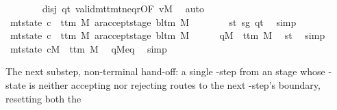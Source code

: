 \begin{isabellebody}
\ \ \ \ \ \ \isamarkupfalse%
\ disj\ qt\ valid{\isacharunderscore}{\kern0pt}mttm{\isacharunderscore}{\kern0pt}t{\isacharunderscore}{\kern0pt}neq{\isacharunderscore}{\kern0pt}r{\isacharbrackleft}{\kern0pt}OF\ vM{\isacharbrackright}{\kern0pt}\ \isamarkupfalse%
\ auto\isanewline
\ \ \ \ \isamarkupfalse%
\ {\isachardoublequoteopen}mt{\isacharunderscore}{\kern0pt}state\ c{\isacharprime}{\kern0pt}\ {\isacharequal}{\kern0pt}\ {\isacharparenleft}{\kern0pt}t{\isacharunderscore}{\kern0pt}tm\ M{\isacharcomma}{\kern0pt}\ ar{\isacharunderscore}{\kern0pt}accept{\isacharunderscore}{\kern0pt}stage\ {\isacharparenleft}{\kern0pt}bl{\isacharunderscore}{\kern0pt}tm\ M{\isacharparenright}{\kern0pt}{\isacharparenright}{\kern0pt}{\isachardoublequoteclose}\isanewline
\ \ \ \ \ \ \isamarkupfalse%
\ st\ sg\ qt\ \isamarkupfalse%
\ simp\isanewline
\ \ \isamarkupfalse%
\isanewline
\ \ \ \ \isamarkupfalse%
\ {\isachardoublequoteopen}mt{\isacharunderscore}{\kern0pt}state\ c{\isacharprime}{\kern0pt}\ {\isacharequal}{\kern0pt}\ {\isacharparenleft}{\kern0pt}t{\isacharunderscore}{\kern0pt}tm\ M{\isacharcomma}{\kern0pt}\ ar{\isacharunderscore}{\kern0pt}accept{\isacharunderscore}{\kern0pt}stage\ {\isacharparenleft}{\kern0pt}bl{\isacharunderscore}{\kern0pt}tm\ M{\isacharparenright}{\kern0pt}{\isacharparenright}{\kern0pt}{\isachardoublequoteclose}\isanewline
\ \ \ \ \isamarkupfalse%
\ {\isachardoublequoteopen}qM{\isacharprime}{\kern0pt}\ {\isacharequal}{\kern0pt}\ t{\isacharunderscore}{\kern0pt}tm\ M{\isachardoublequoteclose}\ \isamarkupfalse%
\ st\ \isamarkupfalse%
\ simp\isanewline
\ \ \ \ \isamarkupfalse%
\ {\isachardoublequoteopen}mt{\isacharunderscore}{\kern0pt}state\ cM\ {\isacharequal}{\kern0pt}\ t{\isacharunderscore}{\kern0pt}tm\ M{\isachardoublequoteclose}\ \isamarkupfalse%
\ qM{\isacharunderscore}{\kern0pt}eq\ \isamarkupfalse%
\ simp\isanewline
\ \ \isamarkupfalse%
\isanewline
{}\isamarkupfalse%
%
\endisatagproof
{\isafoldproof}%
%
\isadelimproof
%
\endisadelimproof
%
\begin{isamarkuptext}%
The next substep, non-terminal hand-off: a single
  -step from an  stage whose -state
   is neither accepting nor rejecting routes to the next
  -step's  boundary, resetting both the

\end{isamarkuptext}
\end{isabellebody}
